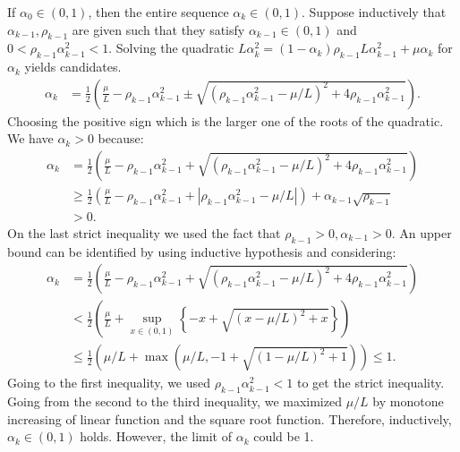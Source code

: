\documentclass[12pt]{article}
\begin{document}
    \begin{observation}\label{obs:r-wapg-observation-1}
        If $\alpha_0 \in (0, 1)$, then the entire sequence $\alpha_k \in (0, 1)$. 
        Suppose inductively that $\alpha_{k - 1}, \rho_{k - 1}$ are given such that they satisfy $\alpha_{k -1} \in (0, 1)$ and $0 < \rho_{k - 1} \alpha_{k - 1}^2 < 1$. 
        Solving the quadratic $L\alpha_k^2=(1 - \alpha_k)\rho_{k - 1}L\alpha_{k - 1}^2 + \mu \alpha_k$ for $\alpha_k$ yields candidates. 
        \begin{align*}
            \alpha_k &= 
            \frac{1}{2}\left(
                \frac{\mu}{L} - \rho_{k - 1}\alpha_{k - 1}^2 
                \pm
                \sqrt{(\rho_{k - 1}\alpha_{k - 1}^2 - \mu/L)^2 + 4\rho_{k - 1}\alpha_{k - 1}^2}
            \right). 
        \end{align*}
        Choosing the positive sign which is the larger one of the roots of the quadratic. 
        We have $\alpha_k > 0$ because: 
        \begin{align*}
            \alpha_k &=
            \frac{1}{2}\left(
                \frac{\mu}{L} - \rho_{k - 1}\alpha_{k - 1}^2 
                +
                \sqrt{(\rho_{k - 1}\alpha_{k - 1}^2 - \mu/L)^2 + 4\rho_{k - 1}\alpha_{k - 1}^2}
            \right)
            \\
            &\ge 
            \frac{1}{2}\left(
                \frac{\mu}{L} - \rho_{k - 1}\alpha_{k - 1}^2 
                +
                \left|\rho_{k - 1}\alpha_{k - 1}^2 - \mu/L\right|
            \right) + \alpha_{k - 1}\sqrt{\rho_{k - 1}}
            \\
            & > 0. 
        \end{align*}
        On the last strict inequality we used the fact that $\rho_{k - 1}> 0, \alpha_{k - 1} > 0$. 
        An upper bound can be identified by using inductive hypothesis and considering: 
        \begin{align*}
            \alpha_k &= 
            \frac{1}{2}\left(
                \frac{\mu}{L} - \rho_{k - 1}\alpha_{k - 1}^2 
                +
                \sqrt{(\rho_{k - 1}\alpha_{k - 1}^2 - \mu/L)^2 + 4\rho_{k - 1}\alpha_{k - 1}^2}
            \right)
            \\
            &<
            \frac{1}{2}\left(
                \frac{\mu}{L} + 
                \sup_{x \in (0, 1)}
                \left\lbrace
                    -x + \sqrt{(x - \mu/L)^2 + x}
                \right\rbrace
            \right)
            \\
            & \le \frac{1}{2}\left(
                \mu/L + \max\left(\mu/L, -1 + \sqrt{(1 - \mu/L)^2 + 1}\right)
            \right) \le 1. 
        \end{align*}
        Going to the first inequality, we used $\rho_{k - 1} \alpha_{k - 1}^2 < 1$ to get the strict inequality. 
        Going from the second to the third inequality, we maximized $\mu/L$ by monotone increasing of linear function and the square root function. 
        Therefore, inductively, $\alpha_k \in (0, 1)$ holds. 
        However, the limit of $\alpha_k$ could be 1. 
    \end{observation}
    
\end{document}
